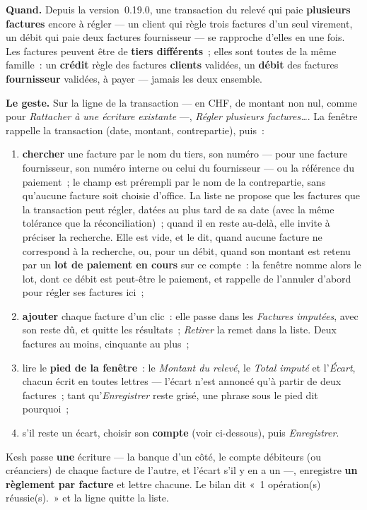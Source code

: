 \documentclass[a4paper,11pt,oneside]{article}
\begin{document}
\textbf{Quand.} Depuis la version~0.19.0, une transaction du relevé qui paie \textbf{plusieurs factures} encore à régler --- un client qui règle trois factures d'un seul virement, un débit qui paie deux factures fournisseur --- se rapproche d'elles en une fois. Les factures peuvent être de \textbf{tiers différents}~; elles sont toutes de la même famille~: un \textbf{crédit} règle des factures \textbf{clients} validées, un \textbf{débit} des factures \textbf{fournisseur} validées, à payer --- jamais les deux ensemble.

\textbf{Le geste.} Sur la ligne de la transaction --- en CHF, de montant non nul, comme pour \emph{Rattacher à une écriture existante} ---, \emph{Régler plusieurs factures\ldots}. La fenêtre rappelle la transaction (date, montant, contrepartie), puis~:
\begin{enumerate}
    \item \textbf{chercher} une facture par le nom du tiers, son numéro --- pour une facture fournisseur, son numéro interne ou celui du fournisseur --- ou la référence du paiement~; le champ est prérempli par le nom de la contrepartie, sans qu'aucune facture soit choisie d'office. La liste ne propose que les factures que la transaction peut régler, datées au plus tard de sa date (avec la même tolérance que la réconciliation)~; quand il en reste au-delà, elle invite à préciser la recherche. Elle est vide, et le dit, quand aucune facture ne correspond à la recherche, ou, pour un débit, quand son montant est retenu par un \textbf{lot de paiement en cours} sur ce compte~: la fenêtre nomme alors le lot, dont ce débit est peut-être le paiement, et rappelle de l'annuler d'abord pour régler ses factures ici~;
    \item \textbf{ajouter} chaque facture d'un clic~: elle passe dans les \emph{Factures imputées}, avec son reste dû, et quitte les résultats~; \emph{Retirer} la remet dans la liste. Deux factures au moins, cinquante au plus~;
    \item lire le \textbf{pied de la fenêtre}~: le \emph{Montant du relevé}, le \emph{Total imputé} et l'\emph{Écart}, chacun écrit en toutes lettres --- l'écart n'est annoncé qu'à partir de deux factures~; tant qu'\emph{Enregistrer} reste grisé, une phrase sous le pied dit pourquoi~;
    \item s'il reste un écart, choisir son \textbf{compte} (voir ci-dessous), puis \emph{Enregistrer}.
\end{enumerate}
Kesh passe \textbf{une} écriture --- la banque d'un côté, le compte débiteurs (ou créanciers) de chaque facture de l'autre, et l'écart s'il y en a un ---, enregistre \textbf{un règlement par facture} et lettre chacune. Le bilan dit «~1 opération(s) réussie(s).~» et la ligne quitte la liste.
\end{document}
